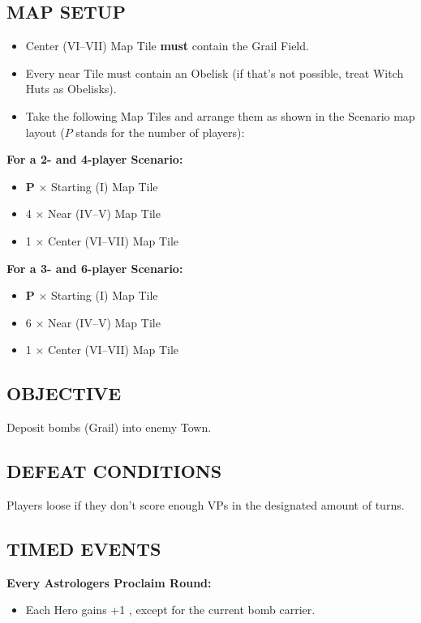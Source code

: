 \begin{multicols}{2}
\subsection*{\MakeUppercase{Map Setup}}
\begin{itemize}
  \item Center (VI--VII) Map Tile \textbf{must} contain the Grail Field.
  \item Every near Tile must contain an Obelisk (if that's not possible, treat Witch Huts as Obelisks).
  \item Take the following Map Tiles and arrange them as shown in the Scenario map layout ($P$ stands for the number of players):
\end{itemize}

\textbf{For a 2- and 4-player Scenario:}
\begin{itemize}
  \item $\boldsymbol{P}$ × Starting (I) Map Tile
  \item 4 × Near (IV--V) Map Tile
  \item 1 × Center (VI--VII) Map Tile
\end{itemize}

\textbf{For a 3- and 6-player Scenario:}
\begin{itemize}
  \item $\boldsymbol{P}$ × Starting (I) Map Tile
  \item 6 × Near (IV--V) Map Tile
  \item 1 × Center (VI--VII) Map Tile
\end{itemize}

\subsection*{\MakeUppercase{Objective}}
Deposit bombs (Grail) into enemy Town.

\subsection*{\MakeUppercase{Defeat Conditions}}
Players loose if they don't score enough VPs in the designated amount of turns.

\subsection*{\MakeUppercase{Timed Events}}

\textbf{Every Astrologers Proclaim Round:}
\begin{itemize}
  \item Each Hero gains +1 , except for the current bomb carrier.
\end{itemize}


\end{multicols}

